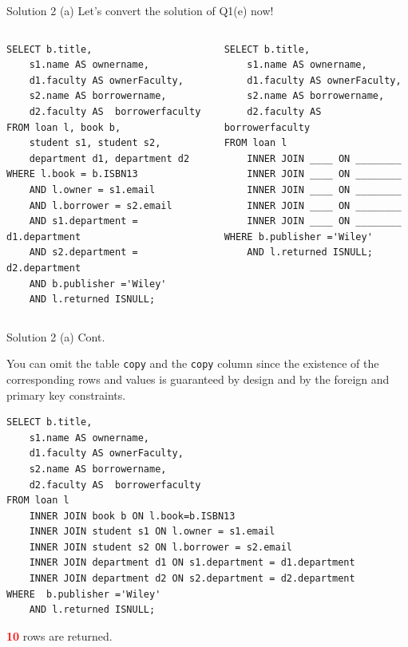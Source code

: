 \begin{frame}[fragile]{Solution 2 (a)}
Let's convert the solution of Q1(e) now!\\
\vspace{10pt}

\begin{columns}

\begin{lstlisting}
SELECT b.title, 
	s1.name AS ownername, 
	d1.faculty AS ownerFaculty, 
	s2.name AS borrowername, 
	d2.faculty AS  borrowerfaculty
FROM loan l, book b,  
	student s1, student s2, 
	department d1, department d2
WHERE l.book = b.ISBN13
	AND l.owner = s1.email
	AND l.borrower = s2.email
	AND s1.department = d1.department
	AND s2.department = d2.department
	AND b.publisher ='Wiley'
	AND l.returned ISNULL;
\end{lstlisting}

\begin{lstlisting}
SELECT b.title, 
	s1.name AS ownername, 
	d1.faculty AS ownerFaculty, 
	s2.name AS borrowername, 
	d2.faculty AS  borrowerfaculty
FROM loan l 
	INNER JOIN ____ ON ________
	INNER JOIN ____ ON ________
	INNER JOIN ____ ON ________
	INNER JOIN ____ ON ________
	INNER JOIN ____ ON ________
WHERE b.publisher ='Wiley'
	AND l.returned ISNULL;
\end{lstlisting}
\end{columns}
	
\end{frame}

\begin{frame}[fragile]{Solution 2 (a) Cont.}

You can omit the table \texttt{copy} and the \texttt{copy} column since the existence of the corresponding rows and values is guaranteed by design and by the foreign and primary key constraints.

\begin{lstlisting}
SELECT b.title, 
	s1.name AS ownername, 
	d1.faculty AS ownerFaculty, 
	s2.name AS borrowername, 
	d2.faculty AS  borrowerfaculty
FROM loan l 
	INNER JOIN book b ON l.book=b.ISBN13
	INNER JOIN student s1 ON l.owner = s1.email
	INNER JOIN student s2 ON l.borrower = s2.email
	INNER JOIN department d1 ON s1.department = d1.department
	INNER JOIN department d2 ON s2.department = d2.department
WHERE  b.publisher ='Wiley'
	AND l.returned ISNULL;
\end{lstlisting} 

\textcolor{red}{\textbf{10}} rows are returned.
\end{frame}

